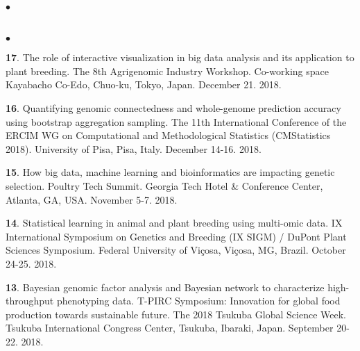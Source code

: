 \documentclass[margin,line,10pt]{res}
\newenvironment{list2}{
  \begin{list}{$\bullet$}{%
      \setlength{\itemsep}{0in}
      \setlength{\parsep}{0in} \setlength{\parskip}{0in}
      \setlength{\topsep}{0in} \setlength{\partopsep}{0in} 
      \setlength{\leftmargin}{0.2in}}}{\end{list}}
\begin{document}
\begin{resume}
\begin{list2}
\end{list2}

  
  
\section{}
\begin{list2}

  \item [{\bf 17}.] The role of interactive visualization in big data analysis and its application to plant breeding. The 8th Agrigenomic Industry Workshop. Co-working space Kayabacho Co-Edo, Chuo-ku, Tokyo, Japan. December 21. 2018. 

    \vspace{0.5cm}
    
   \item [{\bf 16}.] Quantifying genomic connectedness and whole-genome prediction accuracy using bootstrap aggregation sampling. The 11th International Conference of the ERCIM WG on Computational and Methodological Statistics (CMStatistics 2018). University of Pisa, Pisa, Italy. December 14-16. 2018. 

     \vspace{0.5cm}
     
    \item [{\bf 15}.] How big data, machine learning and bioinformatics are impacting genetic selection. Poultry Tech Summit. Georgia Tech Hotel \& Conference Center, Atlanta, GA, USA. November 5-7. 2018. 

      \vspace{0.5cm}
      
  \item [{\bf 14}.] Statistical learning in animal and plant breeding using multi-omic data. IX International Symposium on Genetics and Breeding (IX SIGM) / DuPont Plant Sciences Symposium.  Federal University of Vi\c cosa, Vi\c cosa, MG, Brazil. October 24-25. 2018.
  
  
  \vspace{0.5cm}
  
\item [{\bf 13}.] Bayesian genomic factor analysis and Bayesian network to characterize high-throughput phenotyping data. T-PIRC Symposium: Innovation for global food production towards sustainable future. The 2018 Tsukuba Global Science Week. Tsukuba International Congress Center, Tsukuba, Ibaraki, Japan. September 20-22. 2018.
  

  \vspace{0.5cm}
  

\end{list2}
\end{resume}
\end{document}
